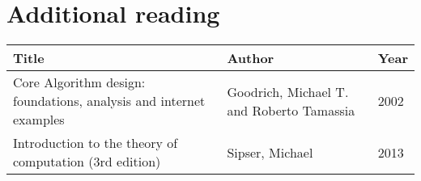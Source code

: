 \section*{Additional reading}

\begin{tabularx}{\textwidth} {|X|X|l|}
  \hline
  
  Title & Author & Year\\ \hline
    Core Algorithm design: foundations, analysis and internet examples &
    Goodrich, Michael T. and Roberto Tamassia &
    2002 \\ \hline
    Introduction to the theory of computation (3rd edition) &
    Sipser, Michael&
    2013\\ \hline
\end{tabularx}